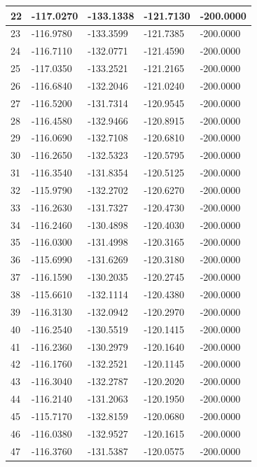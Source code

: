 \begin{longtable}{|l|l|l|l|l|}
22 & -117.0270 & -133.1338 & -121.7130 & -200.0000 \\\hline
23 & -116.9780 & -133.3599 & -121.7385 & -200.0000 \\\hline
24 & -116.7110 & -132.0771 & -121.4590 & -200.0000 \\\hline
25 & -117.0350 & -133.2521 & -121.2165 & -200.0000 \\\hline
26 & -116.6840 & -132.2046 & -121.0240 & -200.0000 \\\hline
27 & -116.5200 & -131.7314 & -120.9545 & -200.0000 \\\hline
28 & -116.4580 & -132.9466 & -120.8915 & -200.0000 \\\hline
29 & -116.0690 & -132.7108 & -120.6810 & -200.0000 \\\hline
30 & -116.2650 & -132.5323 & -120.5795 & -200.0000 \\\hline
31 & -116.3540 & -131.8354 & -120.5125 & -200.0000 \\\hline
32 & -115.9790 & -132.2702 & -120.6270 & -200.0000 \\\hline
33 & -116.2630 & -131.7327 & -120.4730 & -200.0000 \\\hline
34 & -116.2460 & -130.4898 & -120.4030 & -200.0000 \\\hline
35 & -116.0300 & -131.4998 & -120.3165 & -200.0000 \\\hline
36 & -115.6990 & -131.6269 & -120.3180 & -200.0000 \\\hline
37 & -116.1590 & -130.2035 & -120.2745 & -200.0000 \\\hline
38 & -115.6610 & -132.1114 & -120.4380 & -200.0000 \\\hline
39 & -116.3130 & -132.0942 & -120.2970 & -200.0000 \\\hline
40 & -116.2540 & -130.5519 & -120.1415 & -200.0000 \\\hline
41 & -116.2360 & -130.2979 & -120.1640 & -200.0000 \\\hline
42 & -116.1760 & -132.2521 & -120.1145 & -200.0000 \\\hline
43 & -116.3040 & -132.2787 & -120.2020 & -200.0000 \\\hline
44 & -116.2140 & -131.2063 & -120.1950 & -200.0000 \\\hline
45 & -115.7170 & -132.8159 & -120.0680 & -200.0000 \\\hline
46 & -116.0380 & -132.9527 & -120.1615 & -200.0000 \\\hline
47 & -116.3760 & -131.5387 & -120.0575 & -200.0000 \\\hline

\end{longtable}
